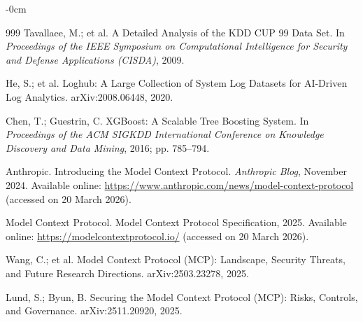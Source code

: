 \documentclass[futureinternet,article,submit,pdftex,moreauthors]{Definitions/mdpi}
\begin{document}
\begin{adjustwidth}{-\extralength}{0cm}
\begin{thebibliography}{999}
Tavallaee, M.; et al. A Detailed Analysis of the KDD CUP 99 Data Set.
In \textit{Proceedings of the IEEE Symposium on Computational Intelligence for Security and
Defense Applications (CISDA)}, 2009.

He, S.; et al. Loghub: A Large Collection of System Log Datasets for AI-Driven Log Analytics.
arXiv:2008.06448, 2020.

Chen, T.; Guestrin, C. XGBoost: A Scalable Tree Boosting System.
In \textit{Proceedings of the ACM SIGKDD International Conference on Knowledge Discovery and
Data Mining}, 2016; pp. 785--794.

Anthropic. Introducing the Model Context Protocol. \textit{Anthropic Blog}, November 2024.
Available online: \url{https://www.anthropic.com/news/model-context-protocol}
(accessed on 20 March 2026).

Model Context Protocol. Model Context Protocol Specification, 2025.
Available online: \url{https://modelcontextprotocol.io/} (accessed on 20 March 2026).

Wang, C.; et al. Model Context Protocol (MCP): Landscape, Security Threats, and Future
Research Directions. arXiv:2503.23278, 2025.

Lund, S.; Byun, B. Securing the Model Context Protocol (MCP): Risks, Controls, and
Governance. arXiv:2511.20920, 2025.

\end{thebibliography}

\PublishersNote{}
\end{adjustwidth}
\end{document}
